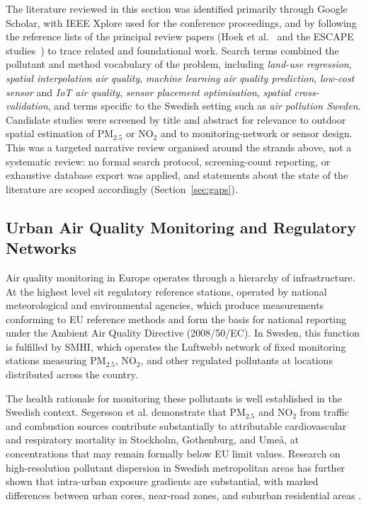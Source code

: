 \documentclass[11pt,a4paper]{article}
\let\oldsubsection\subsection
\renewcommand{\subsection}{\FloatBarrier\oldsubsection}
\begin{document}
The literature reviewed in this section was identified primarily through Google Scholar, with IEEE Xplore used for the conference proceedings, and by following the reference lists of the principal review papers (Hoek et al.~\cite{hoek_lur_review_2008} and the ESCAPE studies~\cite{eeftens_escape_pm_2012, wang_escape_no2_2013}) to trace related and foundational work. Search terms combined the pollutant and method vocabulary of the problem, including \emph{land-use regression}, \emph{spatial interpolation air quality}, \emph{machine learning air quality prediction}, \emph{low-cost sensor} and \emph{IoT air quality}, \emph{sensor placement optimisation}, \emph{spatial cross-validation}, and terms specific to the Swedish setting such as \emph{air pollution Sweden}. Candidate studies were screened by title and abstract for relevance to outdoor spatial estimation of PM$_{2.5}$ or NO$_2$ and to monitoring-network or sensor design. This was a targeted narrative review organised around the strands above, not a systematic review: no formal search protocol, screening-count reporting, or exhaustive database export was applied, and statements about the state of the literature are scoped accordingly (Section~\ref{sec:gaps}).

\subsection{Urban Air Quality Monitoring and Regulatory Networks}
\label{sec:aq-monitoring}

Air quality monitoring in Europe operates through a hierarchy of infrastructure. At the highest level sit regulatory reference stations, operated by national meteorological and environmental agencies, which produce measurements conforming to EU reference methods and form the basis for national reporting under the Ambient Air Quality Directive (2008/50/EC). In Sweden, this function is fulfilled by SMHI, which operates the Luftwebb network of fixed monitoring stations measuring PM$_{2.5}$, NO$_2$, and other regulated pollutants at locations distributed across the country.

The health rationale for monitoring these pollutants is well established in the Swedish context. Segersson et al. \cite{segersson_sweden_health_2017} demonstrate that PM$_{2.5}$ and NO$_2$ from traffic and combustion sources contribute substantially to attributable cardiovascular and respiratory mortality in Stockholm, Gothenburg, and Umeå, at concentrations that may remain formally below EU limit values. Research on high-resolution pollutant dispersion in Swedish metropolitan areas has further shown that intra-urban exposure gradients are substantial, with marked differences between urban cores, near-road zones, and suburban residential areas \cite{sweden_dispersion_2024}.
\end{document}
